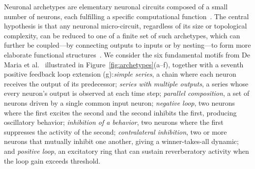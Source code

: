\documentclass[
]{ceurart}
\begin{document}
Neuronal archetypes are elementary neuronal circuits composed of a small
number of neurons, each fulfilling a specific computational
function~\cite{DeMaria2020}. The central hypothesis is that any neuronal
micro-circuit, regardless of its size or topological complexity, can be
reduced to one of a finite set of such archetypes, which can further be
coupled---by connecting outputs to inputs or by nesting---to form more
elaborate functional structures~\cite{DeMaria2020,DeMaria2017}. We consider
the six fundamental motifs from De Maria et al.~\cite{DeMaria2020}
illustrated in Figure~\ref{fig:archetypes}(a--f), together with a seventh
positive feedback loop extension (g):\emph{simple series}, a chain where each neuron receives the output of its
predecessor; \emph{series with multiple outputs}, a series whose every
neuron's output is observed at each time step; \emph{parallel composition},
a set of neurons driven by a single common input neuron; \emph{negative
loop}, two neurons where the first excites the second and the second
inhibits the first, producing oscillatory behavior; \emph{inhibition of a
behavior}, two neurons where the first suppresses the activity of the
second; \emph{contralateral inhibition}, two or more neurons that mutually
inhibit one another, giving a winner-takes-all dynamic; and \emph{positive
loop}, an excitatory ring that can sustain reverberatory activity when the
loop gain exceeds threshold.
\end{document}
